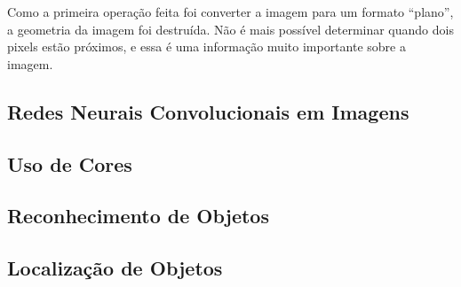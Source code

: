 Como a primeira operação feita foi converter a imagem para um formato “plano”, a
geometria da imagem foi destruída. Não é mais possível determinar quando dois
pixels estão próximos, e essa é uma informação muito importante sobre a imagem.

\subsection{Redes Neurais Convolucionais em Imagens}
\subsection{Uso de Cores}
\subsection{Reconhecimento de Objetos}
\subsection{Localização de Objetos}

